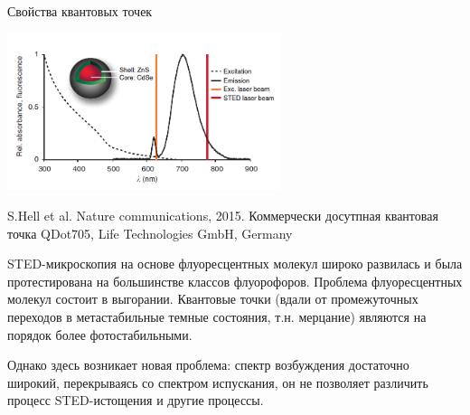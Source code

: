\documentclass[9pt, compress, xcolor=table]{beamer}
\begin{document}

\begin{frame}{Свойства квантовых точек}
\begin{center}
\includegraphics[width=0.6\textwidth]{ffm22}
\end{center}

S.Hell et al. Nature communications, 2015. Коммерчески досутпная квантовая точка QDot705, Life Technologies GmbH, Germany

{\small STED-микроскопия на основе флуоресцентных молекул широко развилась и была протестирована на большинстве классов флуорофоров. Проблема флуоресцентных молекул состоит в выгорании. Квантовые точки (вдали от промежуточных переходов в метастабильные темные состояния, т.н. мерцание) являются на порядок более фотостабильными.

Однако здесь возникает новая проблема: спектр возбуждения достаточно широкий, перекрываясь со спектром испускания, он не позволяет различить процесс STED-истощения и другие процессы.}
\end{frame}
\end{document}
